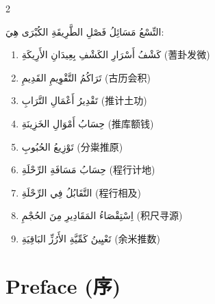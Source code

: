 \documentclass[11pt,a4paper]{article}
\newcommand{\ar}[1]{\arabicfont\beginR #1\endR}
\newcommand{\zhtext}[1]{{\chinese #1}}
\newenvironment{bilingual}{%
  \begin{paracol}{2}
}{%
  \end{paracol}
}
\begin{document}
\begin{bilingual}
\begin{rightcolumn*}
\ar{التِّسْعُ مَسَائِلُ فَصْلِ الطَّرِيقَةِ الكُبْرَى هِيَ:}

\begin{enumerate}[label=\arabic*.]
  \item \ar{كَشْفُ أَسْرَارِ الكَشْفِ بِعِيدَانِ الأَرِيكَةِ (蓍卦发微)}
  \item \ar{تَرَاكُمُ التَّقْوِيمِ القَدِيمِ (古历会积)}
  \item \ar{تَقْدِيرُ أَعْمَالِ التَّرَابِ (推计土功)}
  \item \ar{حِسَابُ أَمْوَالِ الخَزِينَةِ (推库额钱)}
  \item \ar{تَوْزِيعُ الحُبُوبِ (分粜推原)}
  \item \ar{حِسَابُ مَسَافَةِ الرِّحْلَةِ (程行计地)}
  \item \ar{التَّقَابُلُ فِي الرِّحْلَةِ (程行相及)}
  \item \ar{اِسْتِقْصَاءُ المَقَادِيرِ مِنَ الحُجْمِ (积尺寻源)}
  \item \ar{تَعْيِينُ كَمِّيَّةِ الأَرُزِّ البَاقِيَةِ (余米推数)}
\end{enumerate}
\end{rightcolumn*}
\end{bilingual}

\newpage

\section{Preface (\zhtext{序})}
\end{document}
